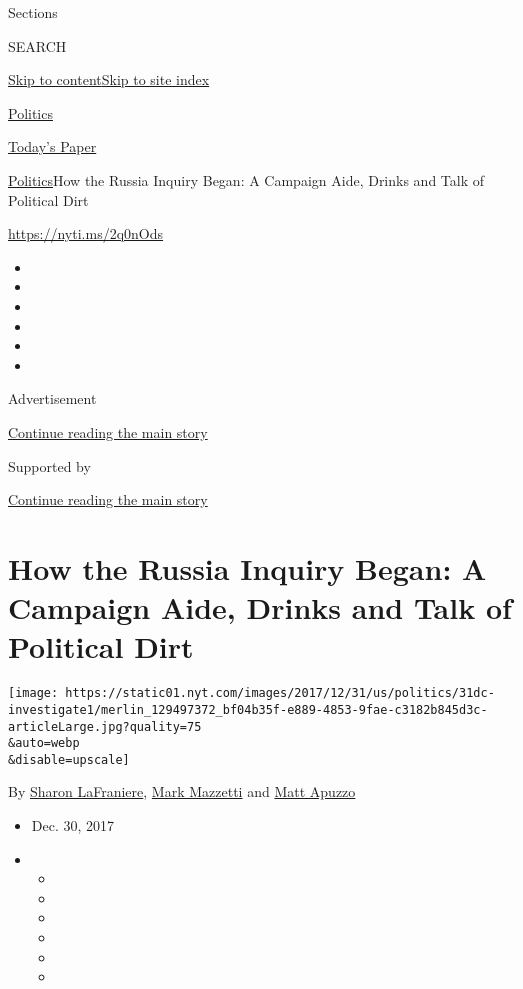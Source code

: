 Sections

SEARCH

\protect\hyperlink{site-content}{Skip to
content}\protect\hyperlink{site-index}{Skip to site index}

\href{https://www.nytimes.com/section/politics}{Politics}

\href{https://myaccount.nytimes.com/auth/login?response_type=cookie\&client_id=vi}{}

\href{https://www.nytimes.com/section/todayspaper}{Today's Paper}

\href{/section/politics}{Politics}\textbar{}How the Russia Inquiry
Began: A Campaign Aide, Drinks and Talk of Political Dirt

\url{https://nyti.ms/2q0nOds}

\begin{itemize}
\item
\item
\item
\item
\item
\item
\end{itemize}

Advertisement

\protect\hyperlink{after-top}{Continue reading the main story}

Supported by

\protect\hyperlink{after-sponsor}{Continue reading the main story}

\hypertarget{how-the-russia-inquiry-began-a-campaign-aide-drinks-and-talk-of-political-dirt}{%
\section{How the Russia Inquiry Began: A Campaign Aide, Drinks and Talk
of Political
Dirt}\label{how-the-russia-inquiry-began-a-campaign-aide-drinks-and-talk-of-political-dirt}}

\texttt{[image: https://static01.nyt.com/images/2017/12/31/us/politics/31dc-investigate1/merlin\_129497372\_bf04b35f-e889-4853-9fae-c3182b845d3c-articleLarge.jpg?quality=75\\\&auto=webp\\\&disable=upscale]}

By \href{https://www.nytimes.com/by/sharon-lafraniere}{Sharon
LaFraniere}, \href{https://www.nytimes.com/by/mark-mazzetti}{Mark
Mazzetti} and \href{https://www.nytimes.com/by/matt-apuzzo}{Matt Apuzzo}

\begin{itemize}
\item
  Dec. 30, 2017
\item
  \begin{itemize}
  \item
  \item
  \item
  \item
  \item
  \item
  \end{itemize}
\end{itemize}


